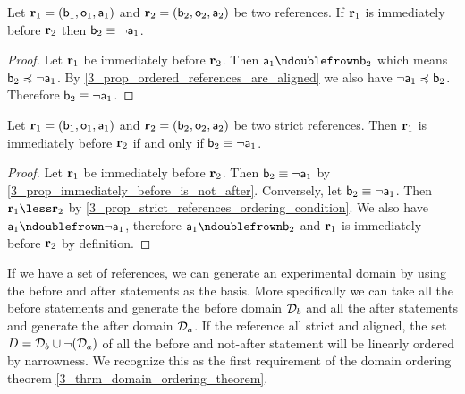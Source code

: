 \documentclass[11pt,letterpaper,fleqn]{memoir} %
\begin{document}
\begin{mathSection}
\begin{prop}\label{3_prop_immediately_before_is_not_after}
	Let $\refStmt_1 = ( \stmt[b]_1, \stmt[o]_1, \stmt[a]_1 )$ and $\refStmt_2 = ( \stmt[b]_2, \stmt[o]_2, \stmt[a]_2 )$ be two references. If $\refStmt_1$ is immediately before $\refStmt_2$ then $\stmt[b]_2 \equiv \NOT \stmt[a]_1$.
\end{prop}
\begin{proof}
	Let $\refStmt_1$ be immediately before $\refStmt_2$. Then $\stmt[a]_1 \ncomp \stmt[b]_2$ which means $\stmt[b]_2 \narrower \NOT \stmt[a]_1$. By \ref{3_prop_ordered_references_are_aligned} we also have $\NOT \stmt[a]_1 \narrower \stmt[b]_2$. Therefore $\stmt[b]_2 \equiv \NOT \stmt[a]_1$.
\end{proof}

\begin{prop}\label{3_prop_strict_consecutive_before_is_not_after}
	Let $\refStmt_1 = ( \stmt[b]_1, \stmt[o]_1, \stmt[a]_1 )$ and $\refStmt_2 = ( \stmt[b]_2, \stmt[o]_2, \stmt[a]_2 )$ be two strict references. Then $\refStmt_1$ is immediately before $\refStmt_2$ if and only if $\stmt[b]_2 \equiv \NOT \stmt[a]_1$.
\end{prop}
\begin{proof}
	Let $\refStmt_1$ be immediately before $\refStmt_2$. Then $\stmt[b]_2 \equiv \NOT \stmt[a]_1$ by \ref{3_prop_immediately_before_is_not_after}. Conversely, let $\stmt[b]_2 \equiv \NOT \stmt[a]_1$. Then $\refStmt_1 \less \refStmt_2$ by \ref{3_prop_strict_references_ordering_condition}. We also have $\stmt[a]_1 \ncomp \NOT \stmt[a]_1$, therefore $\stmt[a]_1 \ncomp \stmt[b]_2$ and $\refStmt_1$ is immediately before $\refStmt_2$ by definition.
\end{proof}

\end{mathSection}

If we have a set of references, we can generate an experimental domain by using the before and after statements as the basis. More specifically we can take all the before statements and generate the before domain $\edomain_b$ and all the after statements and generate the after domain $\edomain_a$. If the reference all strict and aligned, the set $D=\edomain_b \cup \NOT (\edomain_a)$ of all the before and not-after statement will be linearly ordered by narrowness. We recognize this as the first requirement of the domain ordering theorem \ref{3_thrm_domain_ordering_theorem}.
\end{document}
